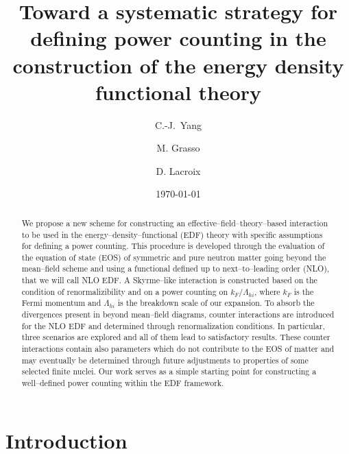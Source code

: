 \documentclass[aps,11pt,prc,preprint,superscriptaddress,nofootinbib]{revtex4}
\begin{document}
\title{Toward a systematic strategy for defining power counting in the construction of the energy density functional theory}
\author{C.-J.~Yang}
\author{M. Grasso}
\author{D. Lacroix}
\date{\today }

\begin{abstract}
We propose a new scheme for constructing an effective--field--theory--based interaction to be used in the energy--density--functional (EDF) theory with specific assumptions for defining a power counting.
This procedure is developed through the 
evaluation of the equation of state (EOS) of symmetric and pure neutron matter going beyond the mean--field scheme and using a functional defined up to next--to--leading order (NLO), that we will call NLO EDF. 
A Skyrme--like
interaction is constructed based on the condition of renormalizibility and on a
power counting on $k_F/\Lambda_{hi}$, where $k_F$ is the Fermi momentum and $\Lambda_{hi}$ is the breakdown scale of our expansion. To absorb the divergences present in beyond mean--field diagrams, counter interactions are introduced for the NLO EDF and determined through renormalization conditions. 
In particular, three scenarios are explored and all of them lead to satisfactory results. 
These counter interactions contain also parameters which do not contribute to the EOS of matter and may eventually be determined through future adjustments to properties of some selected finite nuclei. Our work serves as a simple starting point for constructing a well--defined power counting 
within the EDF framework. 
\end{abstract}

\maketitle

\vspace{10mm}

\section{Introduction}
\end{document}
